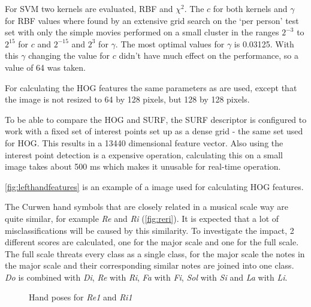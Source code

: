 For SVM two kernels are evaluated, RBF and $\chi^2$. The $c$ for both kernels and $\gamma$ for RBF values where found by an extensive grid search on the `per person' test set with only the simple movies performed on a small cluster in the ranges $2^{-3}$ to $2^{15}$ for $c$ and $2^{-15}$ and $2^3$ for $\gamma$. The most optimal values for $\gamma$ is 0.03125. With this $\gamma$ changing the value for $c$ didn't have much effect on the performance, so a value of 64 was taken.

For calculating the HOG features the same parameters as \citep{watanabe2009} are used, except that the image is not resized to 64 by 128 pixels, but 128 by 128 pixels.

To be able to compare the HOG and SURF, the SURF descriptor is configured to work with a fixed set of interest points set up as a dense grid - the same set used for HOG. This results in a 13440 dimensional feature vector. Also using the interest point detection is a expensive operation, calculating this on a small image takes about 500 ms which makes it unusable for real-time operation.

\autoref{fig:lefthandfeatures} is an example of a image used for calculating HOG features.


The Curwen hand symbols that are closely related in a musical scale way are quite similar, for example \emph{Re} and \emph{Ri} (\autoref{fig:reri}). It is expected that a lot of misclassifications will be caused by this similarity. To investigate the impact, 2 different scores are calculated, one for the major scale and one for the full scale. The full scale threats every class as a single class, for the major scale the notes in the major scale and their corresponding similar notes are joined into one class. \emph{Do} is combined with \emph{Di}, \emph{Re} with \emph{Ri}, \emph{Fa} with \emph{Fi}, \emph{Sol} with \emph{Si} and \emph{La} with \emph{Li}.


\begin{figure}[tb]
  \centering
{}
\hspace{0.03\linewidth}
  \caption{Hand poses for \emph{Re1} and \emph{Ri1}}
  \label{fig:reri}
\end{figure}


